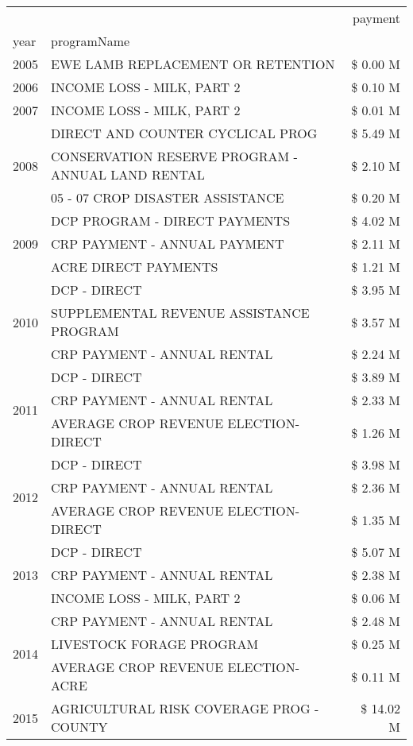 \begin{tabular}{llr}
\toprule
 &  & payment \\
year & programName &  \\
\midrule
2005 & EWE LAMB REPLACEMENT OR RETENTION & \$ 0.00 M \\
\cline{1-3}
2006 & INCOME LOSS - MILK, PART 2 & \$ 0.10 M \\
\cline{1-3}
2007 & INCOME LOSS - MILK, PART 2 & \$ 0.01 M \\
\cline{1-3}
\multirow[t]{3}{*}{2008} & DIRECT AND COUNTER CYCLICAL PROG & \$ 5.49 M \\
 & CONSERVATION RESERVE PROGRAM - ANNUAL LAND RENTAL & \$ 2.10 M \\
 & 05 - 07 CROP DISASTER ASSISTANCE & \$ 0.20 M \\
\cline{1-3}
\multirow[t]{3}{*}{2009} & DCP PROGRAM - DIRECT PAYMENTS & \$ 4.02 M \\
 & CRP PAYMENT - ANNUAL PAYMENT & \$ 2.11 M \\
 & ACRE DIRECT PAYMENTS & \$ 1.21 M \\
\cline{1-3}
\multirow[t]{3}{*}{2010} & DCP - DIRECT & \$ 3.95 M \\
 & SUPPLEMENTAL REVENUE ASSISTANCE PROGRAM & \$ 3.57 M \\
 & CRP PAYMENT - ANNUAL RENTAL & \$ 2.24 M \\
\cline{1-3}
\multirow[t]{3}{*}{2011} & DCP - DIRECT & \$ 3.89 M \\
 & CRP PAYMENT - ANNUAL RENTAL & \$ 2.33 M \\
 & AVERAGE CROP REVENUE ELECTION-DIRECT & \$ 1.26 M \\
\cline{1-3}
\multirow[t]{3}{*}{2012} & DCP - DIRECT & \$ 3.98 M \\
 & CRP PAYMENT - ANNUAL RENTAL & \$ 2.36 M \\
 & AVERAGE CROP REVENUE ELECTION-DIRECT & \$ 1.35 M \\
\cline{1-3}
\multirow[t]{3}{*}{2013} & DCP - DIRECT & \$ 5.07 M \\
 & CRP PAYMENT - ANNUAL RENTAL & \$ 2.38 M \\
 & INCOME LOSS - MILK, PART 2 & \$ 0.06 M \\
\cline{1-3}
\multirow[t]{3}{*}{2014} & CRP PAYMENT - ANNUAL RENTAL & \$ 2.48 M \\
 & LIVESTOCK FORAGE PROGRAM & \$ 0.25 M \\
 & AVERAGE CROP REVENUE ELECTION-ACRE & \$ 0.11 M \\
\cline{1-3}
\multirow[t]{3}{*}{2015} & AGRICULTURAL RISK COVERAGE PROG - COUNTY & \$ 14.02 M \\

\end{tabular}
